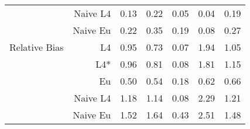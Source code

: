 \documentclass[a4paper,12pt,twoside]{book}
\begin{document}
\begin{table}[H]
\begin{tabular}{crrrrrr}
  
&Naive L4&  
     0.13 & 0.22 & 0.05 & 0.04 & 0.19 \\ 
  
&Naive Eu &  0.22 & 0.35 & 0.19 & 0.08 & 0.27 \\ 
  
   \hline
   
{\color{blue} Relative Bias } & L4  &0.95 & 0.73 & 0.07 & 1.94 & 1.05 \\ 
  
&L4*  &0.96 & 0.81 & 0.08 & 1.81 & 1.15 \\ 
  
  
&Eu &  
    0.50 & 0.54 & 0.18 & 0.62 & 0.66 \\ 
  
 
&Naive L4&  1.18 & 1.14 & 0.08 & 2.29 & 1.21 \\
  
  
  
&Naive Eu &    1.52 & 1.64 & 0.43 & 2.51 & 1.48 \\ 
  
\end{tabular}

\end{table}
\end{document}
